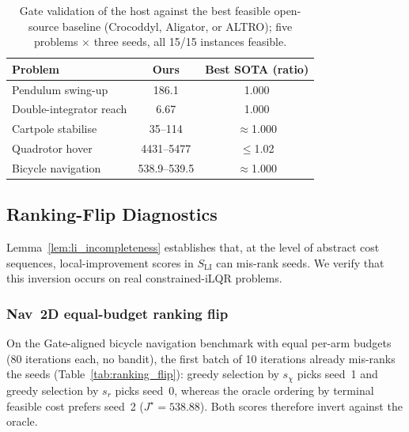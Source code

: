 \documentclass[lettersize,journal]{IEEEtran}
\begin{document}
\begin{table}[t]
\caption{Gate validation of the host against the best feasible
open-source baseline (Crocoddyl, Aligator, or ALTRO); five problems
$\times$ three seeds, all 15/15 instances feasible.}
\label{tab:gate}
\centering
\footnotesize
\begin{tabular}{lcc}
\toprule
Problem & Ours & Best SOTA (ratio) \\
\midrule
Pendulum swing-up & 186.1 & 1.000 \\
Double-integrator reach & 6.67 & 1.000 \\
Cartpole stabilise & 35--114 & $\approx$1.000 \\
Quadrotor hover & 4431--5477 & $\le$1.02 \\
Bicycle navigation & 538.9--539.5 & $\approx$1.000 \\
\bottomrule
\end{tabular}
\end{table}

\subsection{Ranking-Flip Diagnostics}
\label{sec:ranking_flip}

Lemma~\ref{lem:li_incompleteness} establishes that, at the level of
abstract cost sequences, local-improvement scores in $S_{\mathrm{LI}}$
can mis-rank seeds.  We verify that this inversion occurs on real
constrained-iLQR problems.

\subsubsection{Nav~2D equal-budget ranking flip}

On the Gate-aligned bicycle navigation benchmark with equal per-arm budgets
(80 iterations each, no bandit), the first batch of 10 iterations already
mis-ranks the seeds (Table~\ref{tab:ranking_flip}): greedy selection by
$s_\chi$ picks seed~1 and greedy selection by $s_r$ picks seed~0, whereas
the oracle ordering by terminal feasible cost prefers seed~2
($J^\star = 538.88$).  Both scores therefore invert against the oracle.
\end{document}
